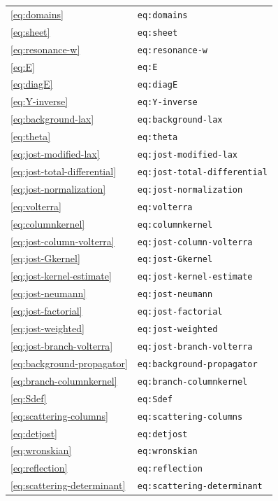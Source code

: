 \begin{longtable}{p{}p{}}
\eqref{eq:domains} & \texttt{eq:domains}\\
\eqref{eq:sheet} & \texttt{eq:sheet}\\
\eqref{eq:resonance-w} & \texttt{eq:resonance-w}\\
\eqref{eq:E} & \texttt{eq:E}\\
\eqref{eq:diagE} & \texttt{eq:diagE}\\
\eqref{eq:Y-inverse} & \texttt{eq:Y-inverse}\\
\eqref{eq:background-lax} & \texttt{eq:background-lax}\\
\eqref{eq:theta} & \texttt{eq:theta}\\
\eqref{eq:jost-modified-lax} & \texttt{eq:jost-modified-lax}\\
\eqref{eq:jost-total-differential} & \texttt{eq:jost-total-differential}\\
\eqref{eq:jost-normalization} & \texttt{eq:jost-normalization}\\
\eqref{eq:volterra} & \texttt{eq:volterra}\\
\eqref{eq:columnkernel} & \texttt{eq:columnkernel}\\
\eqref{eq:jost-column-volterra} & \texttt{eq:jost-column-volterra}\\
\eqref{eq:jost-Gkernel} & \texttt{eq:jost-Gkernel}\\
\eqref{eq:jost-kernel-estimate} & \texttt{eq:jost-kernel-estimate}\\
\eqref{eq:jost-neumann} & \texttt{eq:jost-neumann}\\
\eqref{eq:jost-factorial} & \texttt{eq:jost-factorial}\\
\eqref{eq:jost-weighted} & \texttt{eq:jost-weighted}\\
\eqref{eq:jost-branch-volterra} & \texttt{eq:jost-branch-volterra}\\
\eqref{eq:background-propagator} & \texttt{eq:background-propagator}\\
\eqref{eq:branch-columnkernel} & \texttt{eq:branch-columnkernel}\\
\eqref{eq:Sdef} & \texttt{eq:Sdef}\\
\eqref{eq:scattering-columns} & \texttt{eq:scattering-columns}\\
\eqref{eq:detjost} & \texttt{eq:detjost}\\
\eqref{eq:wronskian} & \texttt{eq:wronskian}\\
\eqref{eq:reflection} & \texttt{eq:reflection}\\
\eqref{eq:scattering-determinant} & \texttt{eq:scattering-determinant}\\

\end{longtable}
